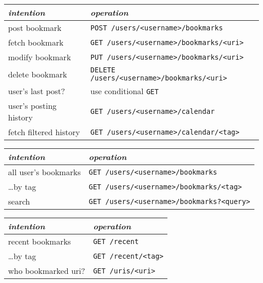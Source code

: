\documentclass{sepslide-soa-faked} %
\begin{document}
\begin{slide}
\begin{flushleft}
\begin{tabular}{@{}ll@{}}
\textit{intention} & \textit{operation} \\ \hline
post bookmark & \verb"POST /users/<username>/bookmarks" \\
fetch bookmark & \verb"GET /users/<username>/bookmarks/<uri>" \\
modify bookmark & \verb"PUT /users/<username>/bookmarks/<uri>" \\
delete bookmark & \verb"DELETE /users/<username>/bookmarks/<uri>" \\
user's last post? & use conditional \verb"GET" \\
user's posting history & \verb"GET /users/<username>/calendar" \\
fetch filtered history & \verb"GET /users/<username>/calendar/<tag>"
\end{tabular}\hspace*{-1in}
\end{flushleft}
\end{slide}

\begin{slide}
\begin{flushleft}
\begin{tabular}{@{}ll@{}}
\textit{intention} & \textit{operation} \\ \hline
all user's bookmarks & \verb"GET /users/<username>/bookmarks" \\
\ldots by tag & \verb"GET /users/<username>/bookmarks/<tag>" \\
search & \verb"GET /users/<username>/bookmarks?<query>" 
\end{tabular}
\end{flushleft}
\end{slide}

\begin{slide}
\begin{flushleft}
\begin{tabular}{@{}ll@{}}
\textit{intention} & \textit{operation} \\ \hline
recent bookmarks & \verb"GET /recent" \\
\ldots by tag & \verb"GET /recent/<tag>" \\
who bookmarked uri? & \verb"GET /uris/<uri>" \\
\end{tabular}
\end{flushleft}
\end{slide}
\end{document}
